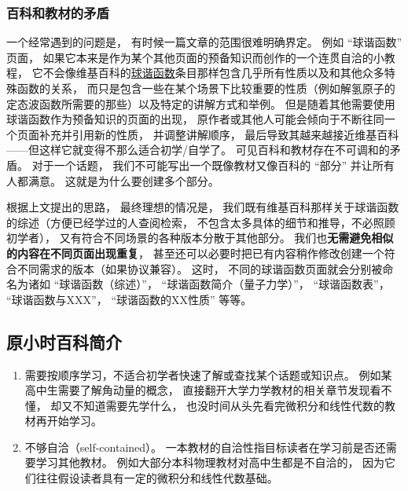 


\subsubsection{百科和教材的矛盾}
一个经常遇到的问题是， 有时候一篇文章的范围很难明确界定。 例如 “球谐函数” 页面， 如果它本来是作为某个其他页面的预备知识而创作的一个连贯自洽的小教程， 它不会像维基百科的\href{https://en.wikipedia.org/wiki/Spherical_harmonics}{球谐函数}条目那样包含几乎所有性质以及和其他众多特殊函数的关系， 而只是包含一些在某个场景下比较重要的性质（例如解氢原子的定态波函数所需要的那些）以及特定的讲解方式和举例。 但是随着其他需要使用球谐函数作为预备知识的页面的出现， 原作者或其他人可能会倾向于不断往同一个页面补充并引用新的性质， 并调整讲解顺序， 最后导致其越来越接近维基百科——但这样它就变得不那么适合初学/自学了。 可见百科和教材存在不可调和的矛盾。 对于一个话题， 我们不可能写出一个既像教材又像百科的 “部分” 并让所有人都满意。 这就是为什么要创建多个部分。

根据上文提出的思路， 最终理想的情况是， 我们既有维基百科那样关于球谐函数的综述（方便已经学过的人查阅检索， 不包含太多具体的细节和推导，不必照顾初学者）， 又有符合不同场景的各种版本分散于其他部分。 我们也\textbf{无需避免相似的内容在不同页面出现重复}， 甚至还可以必要时把已有内容稍作修改创建一个符合不同需求的版本（如果协议兼容）。 这时， 不同的球谐函数页面就会分别被命名为诸如 “球谐函数（综述）”， “球谐函数简介（量子力学）”， “球谐函数表”， “球谐函数与XXX”， “球谐函数的XX性质” 等等。

\subsection{原小时百科简介}\label{sub_about_1}

\begin{enumerate}
\item 需要按顺序学习，不适合初学者快速了解或查找某个话题或知识点。 例如某高中生需要了解角动量的概念， 直接翻开大学力学教材的相关章节发现看不懂， 却又不知道需要先学什么， 也没时间从头先看完微积分和线性代数的教材再开始学习。
\item 不够自洽（self-contained）。 一本教材的自洽性指目标读者在学习前是否还需要学习其他教材。 例如大部分本科物理教材对高中生都是不自洽的， 因为它们往往假设读者具有一定的微积分和线性代数基础。
\end{enumerate}

